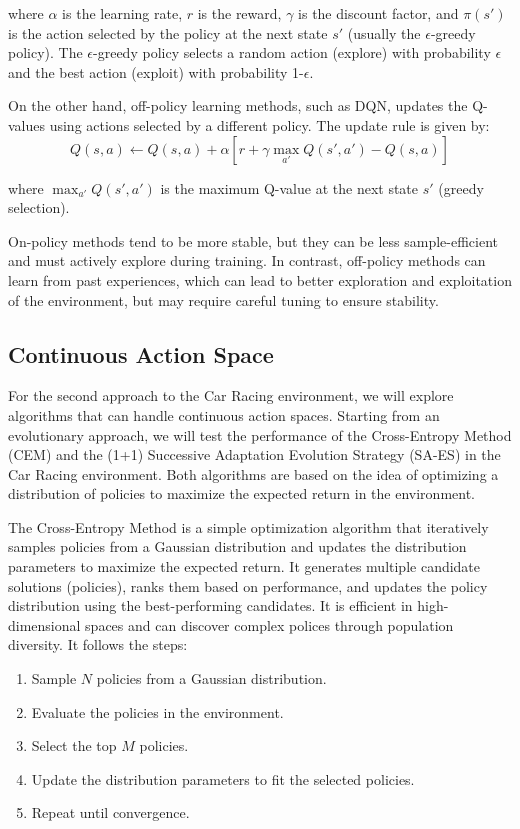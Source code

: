 \documentclass[../CSC_52081_EP.tex]{subfiles}
\begin{document}
    where $\alpha$ is the learning rate, $r$ is the reward, $\gamma$ is the discount factor, and $\pi(s')$ is the action selected by the policy at the next state $s'$ (usually the $\epsilon$-greedy policy).
    The $\epsilon$-greedy policy selects a random action (explore) with probability $\epsilon$ and the best action (exploit) with probability 1-$\epsilon$.
    
    On the other hand, off-policy learning methods, such as DQN, updates the Q-values using actions selected by a different policy. The update rule is given by:
    \begin{equation}
        Q(s, a) \leftarrow Q(s, a) + \alpha \left[ r + \gamma \max_{a'} Q(s', a') - Q(s, a) \right]
    \end{equation}
    
    where $\max_{a'} Q(s', a')$ is the maximum Q-value at the next state $s'$ (greedy selection).

    On-policy methods tend to be more stable, but they can be less sample-efficient and must actively explore during training. In contrast, off-policy methods can learn from past experiences, which can lead to better exploration and exploitation of the environment, but may require careful tuning to ensure stability.

    \subsection{Continuous Action Space}

    For the second approach to the Car Racing environment, we will explore algorithms that can handle continuous action spaces.
    Starting from an evolutionary approach, we will test the performance of the Cross-Entropy Method (CEM) and the (1+1) Successive Adaptation Evolution Strategy (SA-ES) in the Car Racing environment.
    Both algorithms are based on the idea of optimizing a distribution of policies to maximize the expected return in the environment.

    The Cross-Entropy Method is a simple optimization algorithm that iteratively samples policies from a Gaussian distribution and updates the distribution parameters to maximize the expected return.
    It generates multiple candidate solutions (policies), ranks them based on performance, and updates the policy distribution using the best-performing candidates. It is efficient in high-dimensional spaces and can discover complex polices through population diversity. It follows the steps:
    \begin{enumerate}
        \item Sample $N$ policies from a Gaussian distribution.
        \item Evaluate the policies in the environment.
        \item Select the top $M$ policies.
        \item Update the distribution parameters to fit the selected policies.
        \item Repeat until convergence.
    \end{enumerate}
\end{document}
